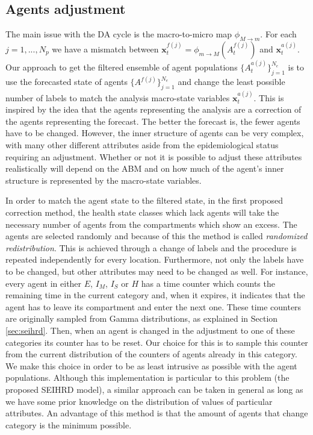 \documentclass[11pt,a4paper]{article}
\renewcommand{\v}[1]{\ensuremath{\mathbf{#1}}}
\begin{document}
\subsection{Agents adjustment}\label{sec:agent_adj}

The main issue with the DA cycle is the macro-to-micro map $\phi_{M\rightarrow m}$. For each $j = 1, ..., N_p$ we  have a  mismatch between $\v x_t^{f(j)} = \phi_{m\rightarrow M}(A_t^{f(j)})$ and $\v x_t^{a(j)}$. Our approach to get the filtered ensemble of agent populations $\{A_t^{a(j)}\}_{j=1}^{N_e}$ is to use the forecasted state of agents $\{A^{f(j)}\}_{j=1}^{N_e}$ and change the least possible number of labels to match the analysis macro-state variables $\v x_t^{a(j)}$. This is inspired by the idea that the agents representing the analysis are a correction of the agents representing the forecast. The better the forecast is, the fewer agents have to be changed. However, the inner structure of agents can be very complex, with many other different  attributes aside from the epidemiological status requiring an adjustment. Whether or not it is possible to adjust these attributes realistically will depend on the ABM and on how much of the agent's inner structure is represented by the macro-state variables. 

In order to match the agent state to the filtered state, in the first proposed correction method, the health state classes which lack agents will take the necessary number of agents from the compartments which show an excess. The agents are selected randomly and because of this the method is called \textit{randomized redistribution}. This is achieved through a change of labels and the procedure is repeated independently for every location. Furthermore, not only the labels have to be changed, but other attributes may need to be changed as well. For instance, every agent in either $E$, $I_M$, $I_S$ or $H$ has a time counter which counts the remaining time in the current category and, when it expires, it indicates that the agent has to leave its compartment and enter the next one. These time counters are originally sampled from Gamma distributions, as explained in Section \ref{sec:seihrd}. Then, when an agent is changed in the adjustment to one of these categories its counter has to be reset. Our choice for this is to sample this counter from the current distribution of the counters of agents already in this category. We make this choice in order to be as least intrusive as possible with the agent populations. Although this implementation is particular to this problem (the proposed SEIHRD model), a similar approach can be taken in general as long as we have some prior knowledge on the distribution of values of particular attributes. An advantage of this method is that the amount of agents that change category is the minimum possible.
\end{document}
